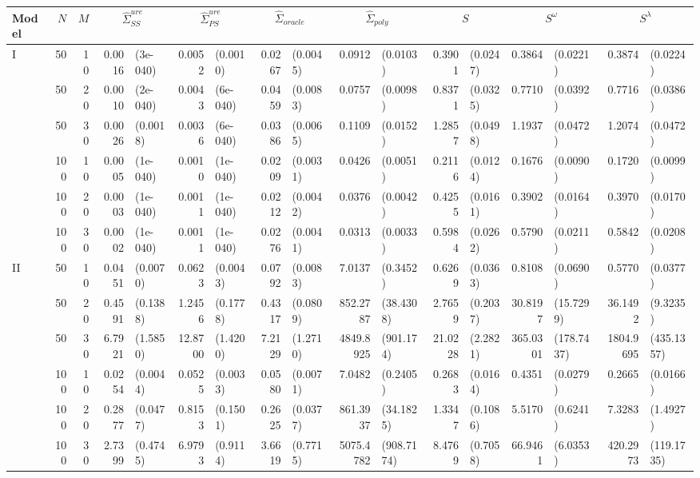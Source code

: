 \begin{landscape}
\begin{table}[H]
\begin{scriptsize}
\begin{tabular}{lrrrlrlrlrlrlrlrl}
   Model & $N$ & $M$ & \multicolumn{2}{c}{$\hat{\Sigma}^{ure}_{SS}$} & \multicolumn{2}{c}{$\hat{\Sigma}^{ure}_{PS}$} & \multicolumn{2}{c}{$\hat{\Sigma}_{oracle}$} & \multicolumn{2}{c}{$\hat{\Sigma}_{poly}$} & \multicolumn{2}{c}{$S$} & \multicolumn{2}{c}{$S^\omega$} & \multicolumn{2}{c}{$S^\lambda$}\\ \hline
I & 50 & 10 & 0.0016 & (3e-040) & 0.0052 & (0.0010) & 0.0267 & (0.0045) & 0.0912 & (0.0103) & 0.3901 & (0.0247) & 0.3864 & (0.0221) & 0.3874 & (0.0224) \\ 
    & 50 & 20 & 0.0010 & (2e-040) & 0.0043 & (6e-040) & 0.0459 & (0.0083) & 0.0757 & (0.0098) & 0.8371 & (0.0325) & 0.7710 & (0.0392) & 0.7716 & (0.0386) \\ 
    & 50 & 30 & 0.0026 & (0.0018) & 0.0036 & (6e-040) & 0.0386 & (0.0065) & 0.1109 & (0.0152) & 1.2857 & (0.0498) & 1.1937 & (0.0472) & 1.2074 & (0.0472) \\ 
    & 100 & 10 & 0.0005 & (1e-040) & 0.0010 & (1e-040) & 0.0209 & (0.0031) & 0.0426 & (0.0051) & 0.2116 & (0.0124) & 0.1676 & (0.0090) & 0.1720 & (0.0099) \\ 
    & 100 & 20 & 0.0003 & (1e-040) & 0.0011 & (1e-040) & 0.0212 & (0.0042) & 0.0376 & (0.0042) & 0.4255 & (0.0161) & 0.3902 & (0.0164) & 0.3970 & (0.0170) \\ 
    & 100 & 30 & 0.0002 & (1e-040) & 0.0011 & (1e-040) & 0.0276 & (0.0041) & 0.0313 & (0.0033) & 0.5984 & (0.0262) & 0.5790 & (0.0211) & 0.5842 & (0.0208) \\ 
   \hline
II & 50 & 10 & 0.0451 & (0.0070) & 0.0623 & (0.0043) & 0.0792 & (0.0083) & 7.0137 & (0.3452) & 0.6269 & (0.0363) & 0.8108 & (0.0690) & 0.5770 & (0.0377) \\ 
    & 50 & 20 & 0.4591 & (0.1388) & 1.2456 & (0.1778) & 0.4317 & (0.0809) & 852.2787 & (38.4308) & 2.7659 & (0.2037) & 30.8197 & (15.7299) & 36.1492 & (9.3235) \\ 
    & 50 & 30 & 6.7921 & (1.5850) & 12.8700 & (1.4200) & 7.2129 & (1.2710) & 4849.8925 & (901.174) & 21.0228 & (2.2821) & 365.0301 & (178.7437) & 1804.9695 & (435.1357) \\ 
    & 100 & 10 & 0.0254 & (0.0044) & 0.0525 & (0.0033) & 0.0580 & (0.0071) & 7.0482 & (0.2405) & 0.2683 & (0.0164) & 0.4351 & (0.0279) & 0.2665 & (0.0166) \\ 
    & 100 & 20 & 0.2877 & (0.0477) & 0.8153 & (0.1501) & 0.2625 & (0.0377) & 861.3937 & (34.1825) & 1.3347 & (0.1086) & 5.5170 & (0.6241) & 7.3283 & (1.4927) \\ 
    & 100 & 30 & 2.7399 & (0.4745) & 6.9793 & (0.9114) & 3.6619 & (0.7715) & 5075.4782 & (908.7174) & 8.4769 & (0.7058) & 66.9461 & (6.0353) & 420.2973 & (119.1735) \\ 

\end{tabular}
\end{scriptsize}
\end{table}
\end{landscape}
